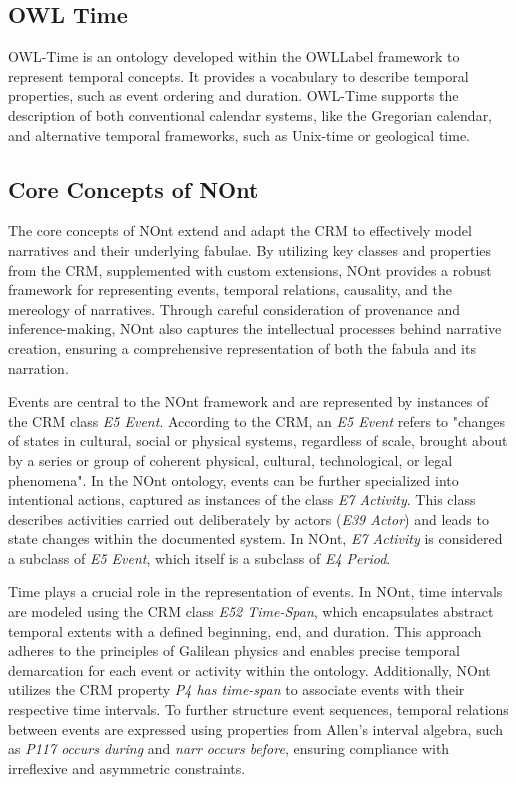 \subsection{OWL Time}\label{III-subsec:owlTime}

OWL-Time \cite{TimeOntologyOWL} is an ontology developed within the \acrshort{OWLLabel} framework to represent temporal concepts. It provides a vocabulary to describe temporal properties, such as event ordering and duration. OWL-Time supports the description of both conventional calendar systems, like the Gregorian calendar, and alternative temporal frameworks, such as Unix-time or geological time.

\subsection{Core Concepts of NOnt}\label{III-subsec:nontCore}

The core concepts of NOnt extend and adapt the CRM to effectively model narratives and their underlying fabulae. By utilizing key classes and properties from the CRM, supplemented with custom extensions, NOnt provides a robust framework for representing events, temporal relations, causality, and the mereology of narratives. Through careful consideration of provenance and inference-making, NOnt also captures the intellectual processes behind narrative creation, ensuring a comprehensive representation of both the fabula and its narration.

Events are central to the NOnt framework and are represented by instances of the CRM class \textit{E5 Event}. According to the CRM, an \textit{E5 Event} refers to "changes of states in cultural, social or physical systems, regardless of scale, brought about by a series or group of coherent physical, cultural, technological, or legal phenomena". In the NOnt ontology, events can be further specialized into intentional actions, captured as instances of the class \textit{E7 Activity}. This class describes activities carried out deliberately by actors (\textit{E39 Actor}) and leads to state changes within the documented system. In NOnt, \textit{E7 Activity} is considered a subclass of \textit{E5 Event}, which itself is a subclass of \textit{E4 Period}. 

Time plays a crucial role in the representation of events. In NOnt, time intervals are modeled using the CRM class \textit{E52 Time-Span}, which encapsulates abstract temporal extents with a defined beginning, end, and duration. This approach adheres to the principles of Galilean physics and enables precise temporal demarcation for each event or activity within the ontology. Additionally, NOnt utilizes the CRM property \textit{P4 has time-span} to associate events with their respective time intervals. To further structure event sequences, temporal relations between events are expressed using properties from Allen's interval algebra, such as \textit{P117 occurs during} and \textit{narr occurs before}, ensuring compliance with irreflexive and asymmetric constraints.


